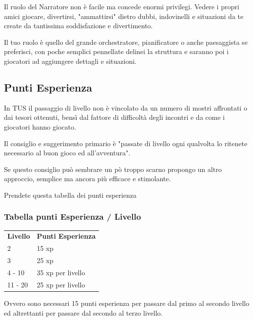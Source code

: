 \documentclass[a4paper,11pt,twoside,openany]{book}
\begin{document}
Il ruolo del Narratore non è facile ma concede enormi privilegi. Vedere i propri amici giocare, divertirsi, "ammattirsi" dietro dubbi, indovinelli e situazioni da te create da tantissima soddisfazione e divertimento.

Il tuo ruolo è quello del grande orchestratore, pianificatore o anche paesaggista se preferisci, con poche semplici pennellate delinei la struttura e saranno poi i giocatori ad aggiungere dettagli e situazioni.



\subsection{Punti Esperienza}

\label{punti-esperienza}

In TUS il passaggio di livello non è vincolato da un numero di mostri affrontati o dai tesori ottenuti, bensì dal fattore di difficoltà degli incontri e da come i giocatori hanno giocato.

Il consiglio e suggerimento primario è "passate di livello ogni qualvolta lo ritenete necessario al buon gioco ed all'avventura".

Se questo consiglio può sembrare un pò troppo scarno propongo un altro approccio, semplice ma ancora più efficace e stimolante.

Prendete questa tabella dei punti esperienza

\subsubsection{Tabella punti Esperienza / Livello}

\label{tabella-punti-esperienza-livello}

\begin{tabular}{ll}
	\toprule
	\textbf{Livello} & \textbf{Punti Esperienza}\\
	2& 15 xp\\
	3& 25 xp\\
	4 - 10           & 35 xp per livello\\
	11 - 20          & 25 xp per livello\\
\end{tabular}

\bigskip

Ovvero sono necessari 15 punti esperienza per passare dal primo al secondo livello ed altrettanti per passare dal secondo al terzo livello.
\end{document}
